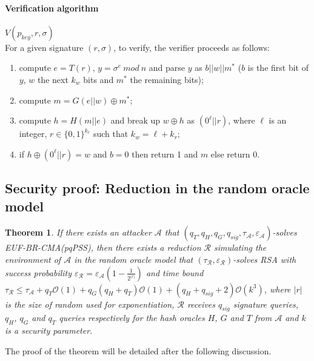 \documentclass[a4paper,11pt]{article}
\newtheorem{theorem}{Theorem}[section]
\begin{document}
\paragraph{Verification algorithm}  $V(p_{key},r,\sigma)$\\
For a given signature $(r,\sigma)$, to verify, the verifier proceeds as follows:
\begin{enumerate}
\item compute $e=T(r)$, $y= \sigma^e \ mod \ n$ and parse $y$ as $b||w||m^*$ ($b$ is the first bit of $y$,  $w$ the next $k_w$ bits and $m^*$ the remaining bits);
\item compute $m= G(e||w)\oplus m^*$;
\item compute $h=H(m||e)$ and  break up $w\oplus h$ as $(0^\ell||r)$, where $\ell$ is an integer, $r\in\{0,1\}^{k_r}$ such that $k_w=\ell+k_r$;
\item if $h\oplus (0^{\ell}||r)=w$ and $b=0$ then return 1 and $m$
else return 0.
\end{enumerate}


\subsection{Security proof: Reduction in the random oracle model}\label{sec:two:2}
\begin{theorem}
\label{theorem1}
If there exists an attacker $\mathcal{A}$ that $(q_{T}, q_{H}, q_{G} , q_{sig} , \tau_{\mathcal{A}} ,\varepsilon_{\mathcal{A}} )$-solves EUF-BR-CMA(pqPSS), then there exists a reduction $\mathcal{R}$ simulating the environment of $\mathcal{A}$ in the random oracle model that $(\tau_{\mathcal{R}} ,\varepsilon_{\mathcal{R}} )$-solves RSA with  success  probability $\varepsilon_{\mathcal{R}} = \varepsilon_{\mathcal{A}}(1-\frac{1}{2^{|r|}}) $   and time bound $\tau_{\mathcal{R}}\leq \tau_{\mathcal{A}} + q_{T}\mathcal{O}(1) + q_{G}(q_{H}+q_{T})\mathcal{O}(1)+ (q_{H}+q_{sig}+2)\mathcal{O}(k^{3})$, where $|r|$ is the size of random  used for exponentiation,  $\mathcal{R}$ receives $q_{sig}$ signature queries, $q_{H}$, $q_{G}$ and $q_{T}$  queries respectively for the hash oracles $H$, $G$ and $T$ from  $\mathcal{A}$ and  $k$ is a security parameter.

\end{theorem}

The proof of the theorem will be detailed after the following discussion.
\end{document}
